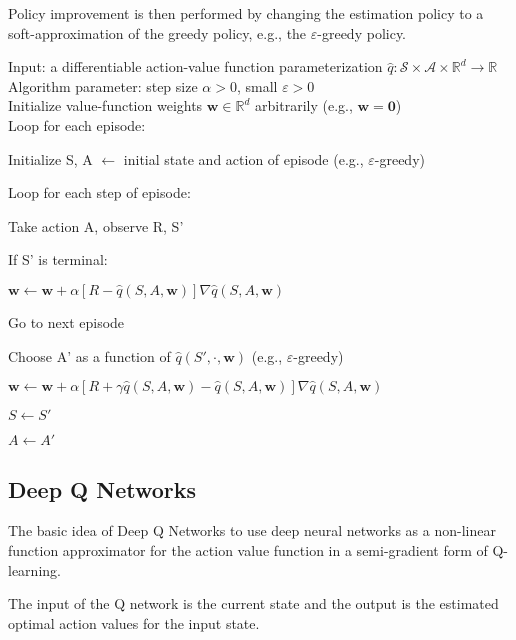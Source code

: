 Policy improvement is then performed by changing the estimation policy to a soft-approximation of the greedy policy, e.g., the $\varepsilon$-greedy policy.

\begin{tcolorbox}[colback=black!7!white,colframe=black!75!white,title=\textbf{Episodic Semi-gradient Sarsa for Estimating} $\mathbf{\hat{q}\approx q_\pi}$]
Input: a differentiable action-value function parameterization $\hat{q}: \mathcal{S}\times\mathcal{A}\times\mathbb{R}^d\rightarrow\mathbb{R}$\\
Algorithm parameter: step size $\alpha > 0$, small $\varepsilon > 0$\\
Initialize value-function weights $\mathbf{w}\in\mathbb{R}^d$ arbitrarily (e.g., $\mathbf{w=0}$)\\

Loop for each episode:

    \qquad Initialize S, A $\leftarrow$ initial state and action of episode (e.g., $\varepsilon$-greedy)

    \qquad Loop for each step of episode:

    \qquad\qquad Take action A, observe R, S'

    \qquad\qquad If S' is terminal:

        \qquad\qquad\qquad $\mathbf{w}\leftarrow\mathbf{w}+\alpha[R-\hat{q}(S, A, \mathbf{w})]\nabla \hat{q}(S, A, \mathbf{w})$

        \qquad\qquad\qquad Go to next episode

    \qquad\qquad Choose A' as a function of $\hat{q}(S', \cdot, \mathbf{w})$ (e.g., $\varepsilon$-greedy)

    \qquad\qquad $\mathbf{w}\leftarrow\mathbf{w}+\alpha[R+\gamma\hat{q}(S, A, \mathbf{w})-\hat{q}(S, A, \mathbf{w})]\nabla \hat{q}(S, A, \mathbf{w})$
    
    \qquad\qquad $S\leftarrow S'$

    \qquad\qquad $A\leftarrow A'$

\end{tcolorbox}

\subsection{Deep Q Networks}
The basic idea of Deep Q Networks to use deep neural networks as a non-linear function approximator for the action value function in a semi-gradient form of Q-learning.

The input of the Q network is the current state and the output is the estimated optimal action values for the input state.

